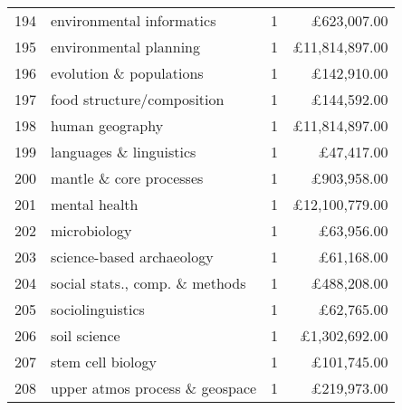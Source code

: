 \begin{spacing}{0.9}
\begin{longtable}[c]{r|>{\raggedleft\arraybackslash}m{6.5cm}|>{\raggedleft\arraybackslash}m{1.9cm}|r}
{194} & {environmental informatics} & {1} & {\pounds623,007.00}\\
{195} & {environmental planning} & {1} & {\pounds11,814,897.00}\\
{196} & {evolution \& populations} & {1} & {\pounds142,910.00}\\
{197} & {food structure/composition} & {1} & {\pounds144,592.00}\\
{198} & {human geography} & {1} & {\pounds11,814,897.00}\\
{199} & {languages \& linguistics} & {1} & {\pounds47,417.00}\\
{200} & {mantle \& core processes} & {1} & {\pounds903,958.00}\\
{201} & {mental health} & {1} & {\pounds12,100,779.00}\\
{202} & {microbiology} & {1} & {\pounds63,956.00}\\
{203} & {science-based archaeology} & {1} & {\pounds61,168.00}\\
{204} & {social stats., comp. \& methods} & {1} & {\pounds488,208.00}\\
{205} & {sociolinguistics} & {1} & {\pounds62,765.00}\\
{206} & {soil science} & {1} & {\pounds1,302,692.00}\\
{207} & {stem cell biology} & {1} & {\pounds101,745.00}\\
{208} & {upper atmos process \& geospace} & {1} & {\pounds219,973.00}
\end{longtable}
\end{spacing}

\clearpage

